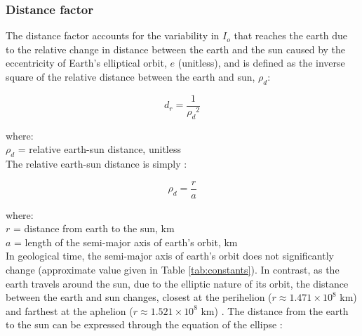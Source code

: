 \subsubsection{Distance factor}
\label{sec:dr}
The distance factor accounts for the variability in $I_o$ that reaches the earth due to the relative change in distance between the earth and the sun caused by the eccentricity of Earth's elliptical orbit, $e$ (unitless), and is defined as the inverse square of the relative distance between the earth and sun, $\rho_{d}$:

\begin{equation}
\label{eq:dr}
    d_{r} = \frac{1}{{\rho_{d}}^2}
\end{equation}

\noindent where: \\
\indent $\rho_{d}$ = relative earth-sun distance, unitless \\

\noindent The relative earth-sun distance is simply \parencite{loutre03}:

\begin{equation}
\label{eq:rho}
    \rho_{d} = \frac{r}{a}
\end{equation}

\noindent where: \\
\indent $r$ = distance from earth to the sun, km \\
\indent $a$ = length of the semi-major axis of earth's orbit, km\\

\noindent In geological time, the semi-major axis of earth's orbit does not significantly change (approximate value given in Table \ref{tab:constants}). 
In contrast, as the earth travels around the sun, due to the elliptic nature of its orbit, the distance between the earth and sun changes, closest at the perihelion ($r \approx 1.471 \times 10^8$ km) and farthest at the aphelion ($r \approx 1.521 \times 10^8$ km) \parencite{allen73}. 
The distance from the earth to the sun can be expressed through the equation of the ellipse \parencite{loutre03}:

